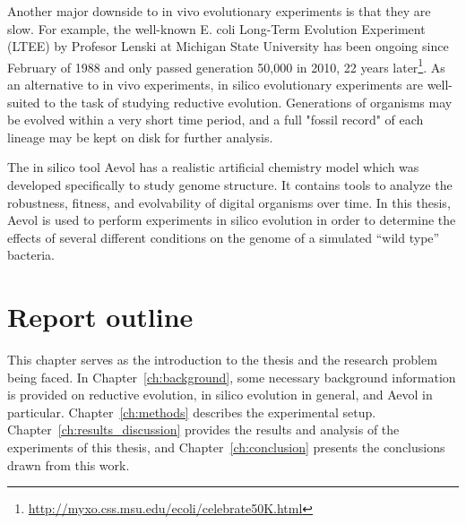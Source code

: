 Another major downside to in vivo evolutionary experiments is that they are slow. For example, the well-known E. coli Long-Term Evolution Experiment (LTEE) by Profesor Lenski at Michigan State University has been ongoing since February of 1988 and only passed generation 50,000 in 2010, 22 years later\footnote{\url{http://myxo.css.msu.edu/ecoli/celebrate50K.html}}. As an alternative to in vivo experiments, in silico evolutionary experiments are well-suited to the task of studying reductive evolution. Generations of organisms may be evolved within a very short time period, and a full "fossil record" of each lineage may be kept on disk for further analysis. 

The in silico tool Aevol has a realistic artificial chemistry model which was developed specifically to study genome structure. It contains tools to analyze the robustness, fitness, and evolvability of digital organisms over time.  In this thesis, Aevol is used to perform experiments in silico evolution in order to determine the effects of several different conditions on the genome of a simulated ``wild type'' bacteria.

\section*{Report outline}
This chapter serves as the introduction to the thesis and the research problem being faced. In Chapter~\ref{ch:background}, some necessary background information is provided on reductive evolution, in silico evolution in general, and Aevol in particular. Chapter~\ref{ch:methods} describes the experimental setup. Chapter~\ref{ch:results_discussion}
provides the results and analysis of the experiments of this thesis, and Chapter~\ref{ch:conclusion} presents the conclusions drawn from this work. 


